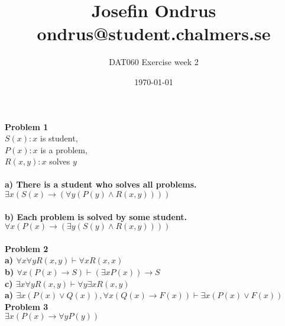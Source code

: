 \documentclass[12pt,oneside,reqno]{amsart}
\begin{document}
\setlength{\parindent}{6pt}
\def\code#1{\texttt{#1}} %
\def\ra{\rightarrow{}} %
\newcommand{\itab}[1]{\hspace{0em}\rlap{#1}}
\newcommand{\tab}[1]{\hspace{.2\textwidth}\rlap{#1}}
\raggedbottom

\title{Josefin Ondrus\\ondrus@student.chalmers.se}
\author{DAT060 Exercise week 2}
\date{\today}
\maketitle

\textbf{Problem 1}\\
$S(x) : x $ is student,\\
$P(x) : x $ is a problem,\\
$R(x, y) : x $ solves $y$\\\\

\textbf{a) There is a student who solves all problems.}\\
$\exists x (S(x) \ra( \forall y (P(y) \land R(x,y))))$\\\\

\textbf{b) Each problem is solved by some student.}\\
$\forall x (P(x) \ra (\exists y (S(y) \land R(x,y))))$\\\\

\textbf{Problem 2}\\

\textbf{a) $\forall x\forall y R(x,y) \vdash \forall x R(x,x)$}\\

\textbf{b) $\forall x (P(x) \ra S) \vdash (\exists x P(x)) \ra S$}\\

\textbf{c) $\exists x \forall y R(x,y) \vdash \forall y \exists x R(x,y)$}\\

\textbf{a) $\exists x (P(x) \lor Q(x)), \forall x(Q(x) \ra F(x)) \vdash \exists x (P(x) \lor F(x))$}\\

\textbf{Problem 3}\\

$\exists x(P(x) \ra \forall y P(y))$
\end{document}
